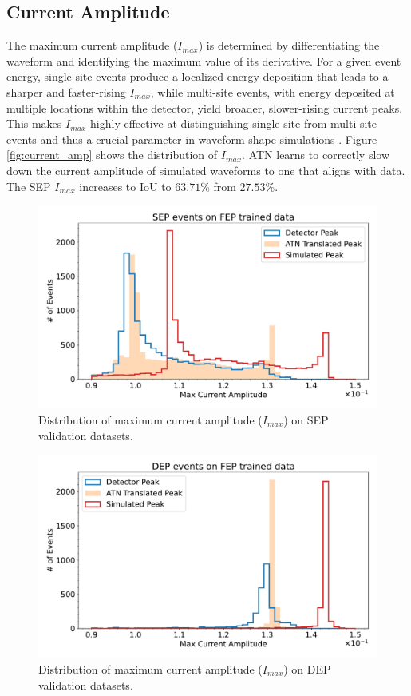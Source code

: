 \subsection{Current Amplitude}

The maximum current amplitude ($I_{max}$) is determined by differentiating the waveform and identifying the maximum value of its derivative. For a given event energy, single-site events produce a localized energy deposition that leads to a sharper and faster-rising $I_{max}$, while multi-site events, with energy deposited at multiple locations within the detector, yield broader, slower-rising current peaks. This makes $I_{max}$ highly effective at distinguishing single-site from multi-site events and thus a crucial parameter in waveform shape simulations \cite{mjd_psd}. Figure \ref{fig:current_amp} shows the distribution of $I_{max}$.  ATN learns to correctly slow down the current amplitude of simulated waveforms to one that aligns with data. The SEP $I_{max}$ increases to IoU to $63.71\%$ from $27.53\%$.
  
\begin{figure}[htb!]
\centering
\includegraphics[width=0.99\linewidth,trim={0pc 0pc 0pc 0pc},clip]{ch8/figs/SEP_amp.pdf}
\caption{ Distribution of maximum current amplitude ($I_{max}$) on SEP validation datasets.}
\label{fig:current_amp_sep}
\end{figure}

\begin{figure}[htb!]
\centering
\includegraphics[width=0.99\linewidth,trim={0pc 0pc 0pc 0pc},clip]{ch8/figs/DEP_amp.pdf}
\caption{ Distribution of maximum current amplitude ($I_{max}$) on DEP validation datasets.}
\label{fig:current_amp_dep}
\end{figure}


